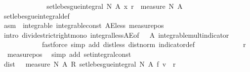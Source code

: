 \begin{isabellebody}
\ \ \ \ \ \ \ \ \isamarkupfalse%
\ \isamarkupfalse%
\ {\isachardoublequoteopen}{\isachardot}{\kern0pt}{\isachardot}{\kern0pt}{\isachardot}{\kern0pt}\ {\isacharless}{\kern0pt}\ set{\isacharunderscore}{\kern0pt}lebesgue{\isacharunderscore}{\kern0pt}integral\ N\ A\ {\isacharparenleft}{\kern0pt}{\isasymlambda}x{\isachardot}{\kern0pt}\ r{\isacharparenright}{\kern0pt}\ {\isacharslash}{\kern0pt}\ measure\ N\ A{\isachardoublequoteclose}\ \isanewline
\ \ \ \ \ \ \ \ \ \ \isamarkupfalse%
\ set{\isacharunderscore}{\kern0pt}lebesgue{\isacharunderscore}{\kern0pt}integral{\isacharunderscore}{\kern0pt}def\ \isanewline
\ \ \ \ \ \ \ \ \ \ \isamarkupfalse%
\ asm\ {\isacharasterisk}{\kern0pt}\ integrable\ integrable{\isacharunderscore}{\kern0pt}const\ AE{\isacharunderscore}{\kern0pt}less\ measure{\isacharunderscore}{\kern0pt}pos\isanewline
\ \ \ \ \ \ \ \ \ \ \isamarkupfalse%
\ {\isacharparenleft}{\kern0pt}intro\ divide{\isacharunderscore}{\kern0pt}strict{\isacharunderscore}{\kern0pt}right{\isacharunderscore}{\kern0pt}mono\ integral{\isacharunderscore}{\kern0pt}less{\isacharunderscore}{\kern0pt}AE{\isacharbrackleft}{\kern0pt}of\ {\isacharunderscore}{\kern0pt}\ {\isacharunderscore}{\kern0pt}\ A{\isacharbrackright}{\kern0pt}\ integrable{\isacharunderscore}{\kern0pt}mult{\isacharunderscore}{\kern0pt}indicator{\isacharparenright}{\kern0pt}\isanewline
\ \ \ \ \ \ \ \ \ \ \ \ {\isacharparenleft}{\kern0pt}fastforce\ simp\ add{\isacharcolon}{\kern0pt}\ dist{\isacharunderscore}{\kern0pt}less\ dist{\isacharunderscore}{\kern0pt}norm\ indicator{\isacharunderscore}{\kern0pt}def{\isacharparenright}{\kern0pt}{\isacharplus}{\kern0pt}\isanewline
\ \ \ \ \ \ \ \ \isamarkupfalse%
\ \isamarkupfalse%
\ {\isachardoublequoteopen}{\isachardot}{\kern0pt}{\isachardot}{\kern0pt}{\isachardot}{\kern0pt}\ {\isacharequal}{\kern0pt}\ r{\isachardoublequoteclose}\ \isamarkupfalse%
\ {\isacharasterisk}{\kern0pt}\ measure{\isacharunderscore}{\kern0pt}pos\ \isamarkupfalse%
\ {\isacharparenleft}{\kern0pt}simp\ add{\isacharcolon}{\kern0pt}\ set{\isacharunderscore}{\kern0pt}integral{\isacharunderscore}{\kern0pt}const{\isacharparenright}{\kern0pt}\isanewline
\ \ \ \ \ \ \ \ \isamarkupfalse%
\ \isamarkupfalse%
\ {\isachardoublequoteopen}dist\ {\isacharparenleft}{\kern0pt}{\isacharparenleft}{\kern0pt}{}\ {\isacharslash}{\kern0pt}\ measure\ N\ A{\isacharparenright}{\kern0pt}\ {\isacharasterisk}{\kern0pt}\isactrlsub R\ set{\isacharunderscore}{\kern0pt}lebesgue{\isacharunderscore}{\kern0pt}integral\ N\ A\ f{\isacharparenright}{\kern0pt}\ v\ {\isacharless}{\kern0pt}\ r{\isachardoublequoteclose}\ \isamarkupfalse%

\end{isabellebody}
